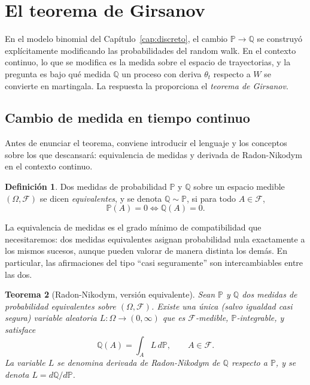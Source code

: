 \documentclass[11pt,a4paper,oneside]{report}
\theoremstyle{plain}
\newtheorem{teorema}{Teorema}[chapter]
\theoremstyle{definition}
\newtheorem{definicion}[teorema]{Definición}
\theoremstyle{remark}
\newcommand{\PP}{\mathbb{P}}
\newcommand{\Q}{\mathbb{Q}}
\newcommand{\F}{\mathcal{F}}
\newcommand{\1}{\mathbf{1}}
\begin{document}
\medskip

\section{El teorema de Girsanov}
\label{sec:girsanov}

En el modelo binomial del Capítulo~\ref{cap:discreto}, el cambio
$\PP \to \Q$ se construyó explícitamente modificando las
probabilidades del random walk. En el contexto continuo, lo que se
modifica es la medida sobre el espacio de trayectorias, y la
pregunta es bajo qué medida $\Q$ un proceso con deriva $\theta_t$
respecto a $W$ se convierte en martingala. La respuesta la
proporciona el \emph{teorema de Girsanov}.

\subsection{Cambio de medida en tiempo continuo}
\label{subsec:cambio_medida}

Antes de enunciar el teorema, conviene introducir el lenguaje y los
conceptos sobre los que descansará: equivalencia de medidas y derivada
de Radon-Nikodym en el contexto continuo.

\medskip

\begin{definicion}
\label{def:medidas_equivalentes}
Dos medidas de probabilidad $\PP$ y $\Q$ sobre un espacio medible
$(\Omega, \F)$ se dicen \emph{equivalentes}, y se denota $\Q \sim \PP$,
si para todo $A \in \F$,
\begin{equation*}
  \PP(A) = 0 \iff \Q(A) = 0.
\end{equation*}
\end{definicion}

La equivalencia de medidas es el grado mínimo de compatibilidad que
necesitaremos: dos medidas equivalentes asignan probabilidad nula
exactamente a los mismos sucesos, aunque pueden valorar de manera
distinta los demás. En particular, las afirmaciones del tipo ``casi
seguramente'' son intercambiables entre las dos.

\begin{teorema}[Radon-Nikodym, versión equivalente]
\label{teo:radon_nikodym}
Sean $\PP$ y $\Q$ dos medidas de probabilidad equivalentes sobre
$(\Omega, \F)$. Existe una única (salvo igualdad casi segura) variable
aleatoria $L : \Omega \to (0, \infty)$ que es $\F$-medible,
$\PP$-integrable, y satisface
\begin{equation}\label{eq:def_RN}
  \Q(A) = \int_A L\, d\PP, \qquad A \in \F.
\end{equation}
La variable $L$ se denomina \emph{derivada de Radon-Nikodym de $\Q$
respecto a $\PP$}, y se denota $L = d\Q/d\PP$.
\end{teorema}
\end{document}
